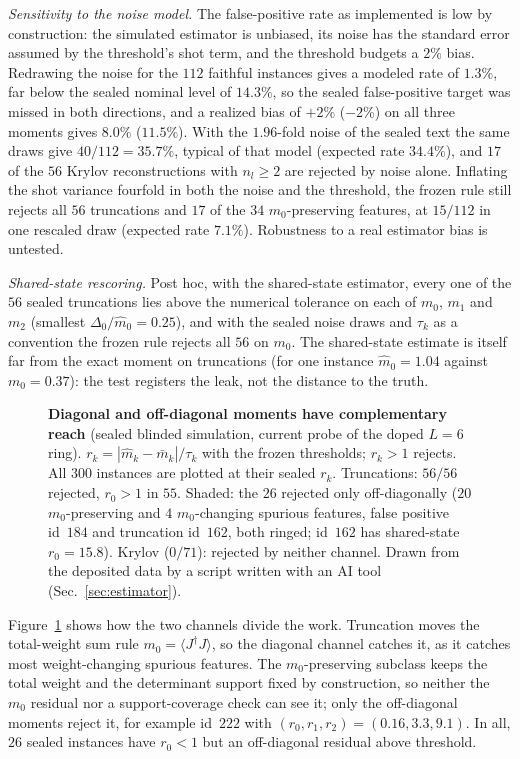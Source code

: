 \documentclass[aps,prb,reprint,onecolumn,12pt,superscriptaddress,longbibliography,floatfix]{revtex4-2}
\newcommand{\colfig}{\setlength{\columnwidth}{0.62\textwidth}}%
\newcommand{\colfig}{}
\begin{document}
\emph{Sensitivity to the noise model.} The false-positive rate as implemented is low by construction: the simulated estimator is unbiased, its noise has the standard error assumed by the threshold's shot term, and the threshold budgets a $2\%$ bias. Redrawing the noise for the $112$ faithful instances gives a modeled rate of $1.3\%$, far below the sealed nominal level of $14.3\%$, so the sealed false-positive target was missed in both directions, and a realized bias of $+2\%$ ($-2\%$) on all three moments gives $8.0\%$ ($11.5\%$). With the $1.96$-fold noise of the sealed text the same draws give $40/112=35.7\%$, typical of that model (expected rate $34.4\%$), and $17$ of the $56$ Krylov reconstructions with $n_l\ge2$ are rejected by noise alone. Inflating the shot variance fourfold in both the noise and the threshold, the frozen rule still rejects all $56$ truncations and $17$ of the $34$ $m_0$-preserving features, at $15/112$ in one rescaled draw (expected rate $7.1\%$). Robustness to a real estimator bias is untested.

\emph{Shared-state rescoring.} Post hoc, with the shared-state estimator, every one of the $56$ sealed truncations lies above the numerical tolerance on each of $m_0$, $m_1$ and $m_2$ (smallest $\Delta_0/\widehat m_0=0.25$), and with the sealed noise draws and $\tau_k$ as a convention the frozen rule rejects all $56$ on $m_0$. The shared-state estimate is itself far from the exact moment on truncations (for one instance $\widehat m_0=1.04$ against $m_0=0.37$): the test registers the leak, not the distance to the truth.

\begin{figure}[t]
\centering\colfig
{}
\caption{\textbf{Diagonal and off-diagonal moments have complementary reach} (sealed blinded simulation, current probe of the doped $L=6$ ring). $r_k=|\widehat m_k-\bar m_k|/\tau_k$ with the frozen thresholds; $r_k>1$ rejects. All $300$ instances are plotted at their sealed $r_k$. Truncations: $56/56$ rejected, $r_0>1$ in $55$. Shaded: the $26$ rejected only off-diagonally ($20$ $m_0$-preserving and $4$ $m_0$-changing spurious features, false positive id~$184$ and truncation id~$162$, both ringed; id~$162$ has shared-state $r_0=15.8$). Krylov ($0/71$): rejected by neither channel. Drawn from the deposited data by a script written with an AI tool (Sec.~\ref{sec:estimator}).}
\label{fig:separating}
\end{figure}

Figure~\ref{fig:separating} shows how the two channels divide the work. Truncation moves the total-weight sum rule $m_0=\langle J^\dagger J\rangle$, so the diagonal channel catches it, as it catches most weight-changing spurious features. The $m_0$-preserving subclass keeps the total weight and the determinant support fixed by construction, so neither the $m_0$ residual nor a support-coverage check can see it; only the off-diagonal moments reject it, for example id~$222$ with $(r_0,r_1,r_2)=(0.16,3.3,9.1)$. In all, $26$ sealed instances have $r_0<1$ but an off-diagonal residual above threshold.
\end{document}
